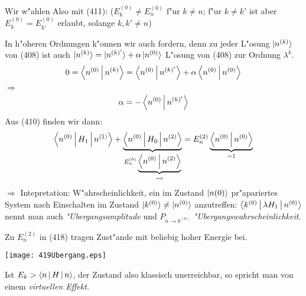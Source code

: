 \documentclass[a4paper]{scrartcl}
\begin{document}
Wir w"ahlen
Also mit (411):
($E_k^{(0)} \neq E_n^{(0)}$ f"ur $k \neq n$; f"ur $k \neq k'$ ist aber $E_k^{(0)} = E_{k'}^{(0)}$ erlaubt, solange $k, k' \neq n$)

In h"oheren Ordnungen k"onnen wir auch
fordern, denn zu jeder L"osung $\ket{ n^{(k)}}$ von (408) ist auch $\ket{ n^{(k)}} = \ket{n^{(k)'}} + \alpha \ket{ n^{(0)}}$ L"osung von (408) zur Ordnung $\lambda^k$.
$$0 = \Braket{ n^{(0)} | n^{(k)}} = \Braket{ n^{(0)} | n^{(k)'}} + \alpha \Braket{ n^{(0)} | n^{(0)}}$$
$\Longrightarrow$
$$\alpha  = - \Braket{ n^{(0)} | n^{(k)'}}$$
Aus (410) finden wir dann:
$$\Braket{ n^{(0)} | H_1 | n^{(1)}} + \underbrace{ \Braket{ n^{(0)} | H_0 | n^{(2)}}}_{E_n^{(0)} \underbrace{ \Braket{ n^{(0)} | n^{(2)}}}_{=0}} = E_n^{(2)} \underbrace{ \Braket{ n^{(0)} | n^{(0)}}}_{=1}$$
$\Longrightarrow$
Intepretation: W"ahrscheinlichkeit, ein im Zustand $\ket{n {(0)}}$ pr"apariertes System nach Einschalten im Zustand $\ket{ k^{(0)}} \neq \ket{n^{(0)}}$ anzutreffen:
$\Braket{ k^{(0)} | \lambda H_1 | n^{(0)}}$ nennt man auch \emph{"Ubergangsamplitude} und $P_{n \rightarrow k^{(0)}}$ \emph{"Ubergangswahrscheinlichkeit}.

Zu $E_n^{(2)}$ in (418) tragen Zust"ande mit beliebig hoher Energie bei.
\begin{center}
\texttt{[image: 419Ubergang.eps]}
\end{center}
Ist $E_k > \Braket{n | H | n}$, der Zustand also klassisch unerreichbar, so spricht man von einem \emph{virtuellen Effekt.}
\end{document}
